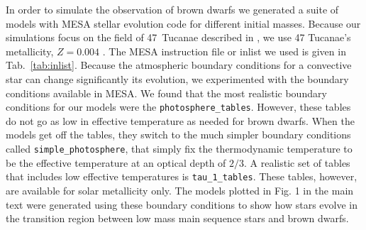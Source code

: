 \documentclass[useAMS,usenatbib]{mnras}
\begin{document}
In order to simulate the observation of brown dwarfs we generated a suite of models with MESA stellar evolution code \citep{2011ApJS..192....3P} for different initial masses. Because our simulations focus on the field of
47~Tucanae described in \citet{1538-3881-143-1-11}, we use 47 Tucanae's metallicity, $Z=0.004$ \citep{2014MNRAS.437.3274V}.  The MESA instruction file or inlist we used is given in Tab.~\ref{tab:inlist}. Because the atmospheric boundary conditions for a convective star can change significantly its evolution, we experimented with the boundary conditions available in MESA. We found that the most realistic boundary conditions for our models were the \texttt{photosphere\_tables}. However, these tables do not go as low in effective temperature as needed for brown dwarfs. When the models get off the tables, they switch to the much simpler boundary conditions called \texttt{simple\_photosphere}, that simply fix the thermodynamic temperature to be the effective temperature at an optical depth of $2/3$. A realistic set of tables that includes low effective temperatures is \texttt{tau\_1\_tables}. These tables, however, are available for solar metallicity only. The models plotted in Fig. 1 in the main text were generated using these boundary conditions to show how stars evolve in the transition region between low mass main sequence stars and brown dwarfs.
\end{document}
